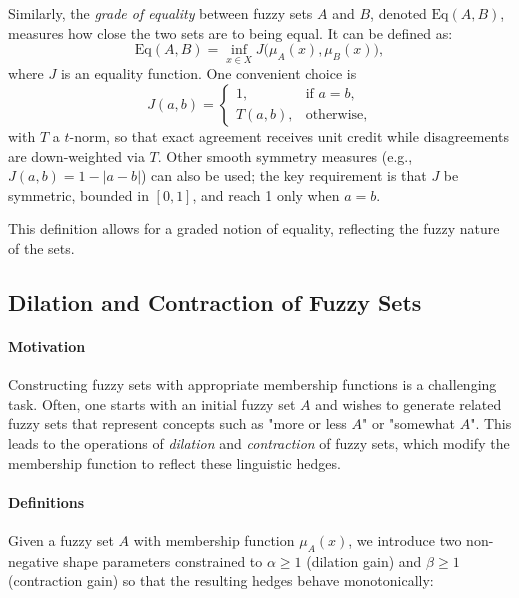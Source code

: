 Similarly, the \emph{grade of equality} between fuzzy sets \( A \) and \( B \), denoted \( \mathrm{Eq}(A, B) \), measures how close the two sets are to being equal. It can be defined as:
\begin{equation}
\mathrm{Eq}(A, B) = \inf_{x \in X} J\big(\mu_A(x), \mu_B(x)\big),
\label{eq:grade_equality}
\end{equation}
where \( J \) is an equality function. One convenient choice is
\begin{equation}
J(a, b) = \begin{cases}
1, & \text{if } a = b, \\
T(a, b), & \text{otherwise},
\end{cases}
\label{eq:equality_function}
\end{equation}
with \( T \) a \( t \)-norm, so that exact agreement receives unit credit while disagreements are down-weighted via \(T\). Other smooth symmetry measures (e.g., \(J(a, b) = 1 - |a-b|\)) can also be used; the key requirement is that \(J\) be symmetric, bounded in \([0,1]\), and reach 1 only when \(a=b\).

This definition allows for a graded notion of equality, reflecting the fuzzy nature of the sets.

\subsection{Dilation and Contraction of Fuzzy Sets}
\label{sec:fuzzysets_dilation_and_contraction_of_fuzzy_sets}

\paragraph{Motivation}

Constructing fuzzy sets with appropriate membership functions is a challenging task. Often, one starts with an initial fuzzy set \( A \) and wishes to generate related fuzzy sets that represent concepts such as "more or less \( A \)" or "somewhat \( A \)". This leads to the operations of \emph{dilation} and \emph{contraction} of fuzzy sets, which modify the membership function to reflect these linguistic hedges.

\paragraph{Definitions}

Given a fuzzy set \( A \) with membership function \(\mu_A(x)\), we introduce two non-negative shape parameters constrained to \(\alpha\ge 1\) (dilation gain) and \(\beta\ge 1\) (contraction gain) so that the resulting hedges behave monotonically:

